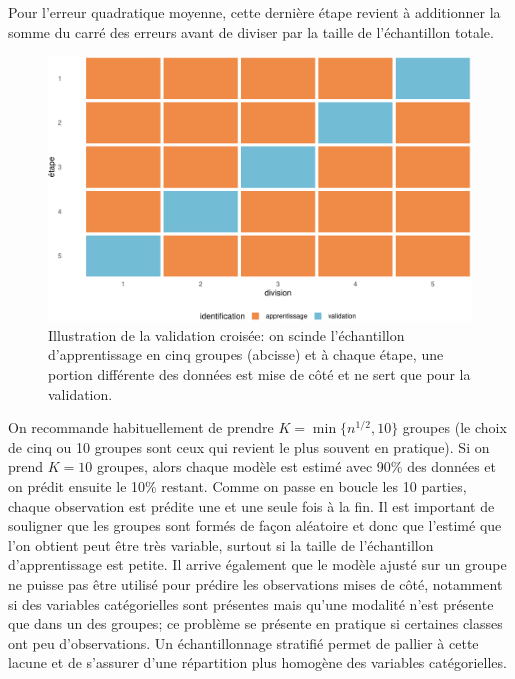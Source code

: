 \documentclass[
  11pt,
  letterpaper,
]{book}
\theoremstyle{definition}
\theoremstyle{remark}
\begin{document}
Pour l'erreur quadratique moyenne, cette dernière étape revient à
additionner la somme du carré des erreurs avant de diviser par la taille
de l'échantillon totale.

\begin{figure}[ht!]

{\centering \includegraphics[width=1\textwidth,height=\textheight]{./04-selectionmodeles_files/figure-pdf/fig-validationcroiseeillust-1.pdf}

}

\caption{\label{fig-validationcroiseeillust}Illustration de la
validation croisée: on scinde l'échantillon d'apprentissage en cinq
groupes (abcisse) et à chaque étape, une portion différente des données
est mise de côté et ne sert que pour la validation.}

\end{figure}

On recommande habituellement de prendre \(K=\min\{n^{1/2}, 10\}\)
groupes (le choix de cinq ou 10 groupes sont ceux qui revient le plus
souvent en pratique). Si on prend \(K=10\) groupes, alors chaque modèle
est estimé avec 90\% des données et on prédit ensuite le 10\% restant.
Comme on passe en boucle les 10 parties, chaque observation est prédite
une et une seule fois à la fin. Il est important de souligner que les
groupes sont formés de façon aléatoire et donc que l'estimé que l'on
obtient peut être très variable, surtout si la taille de l'échantillon
d'apprentissage est petite. Il arrive également que le modèle ajusté sur
un groupe ne puisse pas être utilisé pour prédire les observations mises
de côté, notamment si des variables catégorielles sont présentes mais
qu'une modalité n'est présente que dans un des groupes; ce problème se
présente en pratique si certaines classes ont peu d'observations. Un
échantillonnage stratifié permet de pallier à cette lacune et de
s'assurer d'une répartition plus homogène des variables catégorielles.
\end{document}
